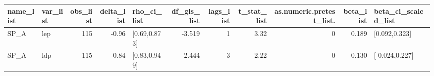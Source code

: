 \begin{table}[ht]
\centering
\begin{tabular}{llrrlrrrrrl}
  \hline
name\_list & var\_list & obs\_list & delta\_list & rho\_ci\_list & df\_gls\_list & lags\_list & t\_stat\_list & as.numeric.pretest\_list. & beta\_list & beta\_ci\_scaled\_list \\ 
  \hline
SP\_A & lep & 115 & -0.96 & [0.69,0.873] & -3.519 & 1 & 3.32 & 0 & 0.189 & [0.092,0.323] \\ 
  SP\_A & ldp & 115 & -0.84 & [0.83,0.949] & -2.444 & 3 & 2.22 & 0 & 0.130 & [-0.024,0.227] \\ 
   \hline
\end{tabular}
\end{table}
